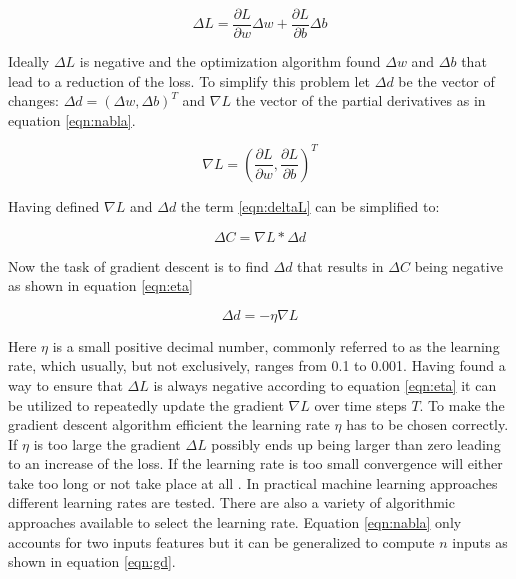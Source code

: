 \begin{equation}
  \Delta L = \frac{\partial L}{\partial w} \Delta w + \frac{\partial L}{\partial b} \Delta b
\label{eqn:deltaL} 
\end{equation}

Ideally $\Delta L$ is negative and the optimization algorithm found $\Delta w$ and
$\Delta b$ that lead to a reduction of the loss. To simplify this problem let $\Delta d$
be the vector of changes: $\Delta d = (\Delta w , \Delta b)^T $ and $\nabla L$ the vector
of the partial derivatives as in equation \ref{eqn:nabla}.


\begin{equation}
 \nabla L = \left(\frac{\partial L}{\partial w}, \frac{\partial L}{\partial b}\right)^T
\label{eqn:nabla}
\end{equation}

Having defined $\nabla L$ and $\Delta d$ the term \ref{eqn:deltaL} can be simplified to:

\begin{equation}
\Delta C = \nabla L * \Delta d
 \label{eqn:cd}
\end{equation}

Now the task of gradient descent is to find $\Delta d$ that results in $\Delta C$ being negative as
shown in equation \ref{eqn:eta}

\begin{equation}
 \Delta d = -\eta \nabla L
 \label{eqn:eta}
\end{equation}

Here $\eta$ is a small positive decimal number, commonly referred to as the learning rate,
which usually, but not exclusively, ranges from 0.1 to 0.001.  Having found a way to
ensure that $\Delta L$ is always negative according to equation \ref{eqn:eta} it can be
utilized to repeatedly update the gradient $\nabla L$ over time steps $T$. To make the
gradient descent algorithm efficient the learning rate $\eta$ has to be chosen
correctly. If $\eta$ is too large the gradient $\Delta L$ possibly ends up being larger
than zero leading to an increase of the loss. If the learning rate is too small
convergence will either take too long or not take place at all
\cite{bergstra2011algorithms}. In practical machine learning approaches different learning
rates are tested. There are also a variety of algorithmic approaches available to select
the learning rate. Equation \ref{eqn:nabla} only accounts for two inputs features but it
can be generalized to compute $n$ inputs as shown in equation \ref{eqn:gd}.

